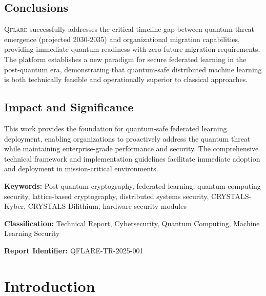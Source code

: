 \documentclass[12pt,a4paper,twoside]{book}
\newcommand{\qflare}{\textsc{Qflare}}
\begin{document}
\section*{Conclusions}
\qflare{} successfully addresses the critical timeline gap between quantum threat emergence (projected 2030-2035) and organizational migration capabilities, providing immediate quantum readiness with zero future migration requirements. The platform establishes a new paradigm for secure federated learning in the post-quantum era, demonstrating that quantum-safe distributed machine learning is both technically feasible and operationally superior to classical approaches.

\section*{Impact and Significance}
This work provides the foundation for quantum-safe federated learning deployment, enabling organizations to proactively address the quantum threat while maintaining enterprise-grade performance and security. The comprehensive technical framework and implementation guidelines facilitate immediate adoption and deployment in mission-critical environments.

\vspace{1cm}
\noindent\textbf{Keywords:} Post-quantum cryptography, federated learning, quantum computing security, lattice-based cryptography, distributed systems security, CRYSTALS-Kyber, CRYSTALS-Dilithium, hardware security modules

\vspace{0.5cm}
\noindent\textbf{Classification:} Technical Report, Cybersecurity, Quantum Computing, Machine Learning Security

\vspace{0.5cm}
\noindent\textbf{Report Identifier:} QFLARE-TR-2025-001

\tableofcontents

\listoffigures

\listoftables

\listofalgorithms

\printnomenclature

\mainmatter

\chapter{Introduction}
\label{ch:introduction}
\end{document}
